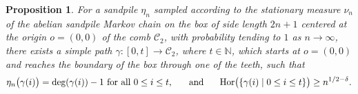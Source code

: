 \documentclass[11pt]{article}
\newtheorem{proposition}{Proposition}[section]
\begin{document}
\begin{proposition}\label{prop:full-height-path}
For a sandpile $\eta_n$ sampled according to the stationary measure $\nu_n$ of the abelian sandpile Markov chain on the box of side length $2n+1$ centered at the origin $o=(0,0)$ of the comb $\mathcal{C}_2$, with probability tending to $1$ as $n\to\infty$, there exists a simple path $\gamma:[0,t]\to \mathcal{C}_2$, where $t\in\mathbb{N}$, which starts at $o=(0,0)$ and reaches the boundary of the box through one of the teeth, such that
$$\eta_n\big(\gamma(i)\big)=\deg(\gamma(i))-1\text{ for all }0\leq i\leq t,\hspace{0.5cm}\text{ and }\hspace{0.5cm}\text{Hor}\big(\{\gamma(i)\;|\;0\leq i\leq t\}\big)\geq n^{1/2-\delta}.$$
\end{proposition}
\end{document}
